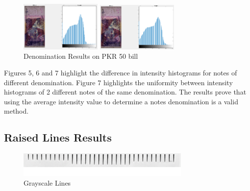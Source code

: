 \documentclass{article}
\begin{document}
\begin{figure}[h]
\begin{minipage}[b]{.48\linewidth}
  \centering
  \centerline{\includegraphics[width=4.0cm]{denomination3_1.png}}
  \centerline{}%
  \vspace{-4mm}
\end{minipage}
\hfill
\begin{minipage}[b]{0.48\linewidth}
  \centering
  \centerline{\includegraphics[width=4.0cm]{denomination3_2.png}}
  \centerline{}%
  \vspace{-4mm}
\end{minipage}
\caption{Denomination Results on PKR 50 bill}
\label{fig:50rs}
\vspace{-2mm}
\end{figure}
\newpage
Figures 5, 6 and 7 highlight the difference in intensity histograms for notes of different denomination. Figure 7 highlights the uniformity between intensity histograms of 2 different notes of the same denomination. The results prove that using the average intensity value to determine a notes denomination is a valid method.

\subsection{Raised Lines Results}

\begin{figure}[h!]

\begin{minipage}[b]{1.0\linewidth}
  \centering
  \centerline{\includegraphics[width=8.5cm]{lines1.png}}
  \vspace{-3mm}
\end{minipage}
%
\caption{Grayscale Lines}
\label{fig:lines1}
\vspace{-3mm}
\end{figure}
\end{document}
